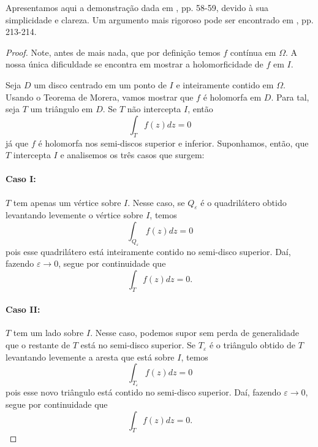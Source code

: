Apresentamos aqui a demonstração dada em \cite{MR1976398}, pp. 58-59, 
devido à sua simplicidade e clareza. Um argumento mais rigoroso pode ser 
encontrado em \cite{MR503901}, pp. 213-214.

\begin{proof}
Note, antes de mais nada, que por definição temos $f$ contínua em $\Omega$.
A nossa única dificuldade se encontra em mostrar a holomorficidade de $f$ em $I$.

Seja $D$ um disco centrado em um ponto de $I$ e inteiramente contido em $\Omega$.
Usando o Teorema de Morera, vamos mostrar que $f$ é holomorfa em $D$. Para tal,
seja $T$ um triângulo em $D$. Se $T$ não intercepta $I$, então
\begin{equation*}
    \int_T f(z) dz = 0
\end{equation*}
já que $f$ é holomorfa nos semi-discos superior e inferior. Suponhamos, então,
que $T$ intercepta $I$ e analisemos os três casos que surgem:
\paragraph{Caso I:} $T$ tem apenas um vértice sobre $I$. Nesse caso, se 
$Q_{\varepsilon}$ é o quadrilátero obtido levantando levemente o vértice sobre $I$,
temos
\begin{equation*}
    \int_{Q_{\varepsilon}} f(z) dz = 0
\end{equation*}
pois esse quadrilátero está inteiramente contido no semi-disco superior. Daí,
fazendo $\varepsilon\to 0$, segue por continuidade que
\begin{equation*}
    \int_T f(z) dz = 0.
\end{equation*}

\paragraph{Caso II:} $T$ tem um lado sobre $I$. Nesse caso, podemos supor sem perda
de generalidade que o restante de $T$ está no semi-disco superior. Se $T_{\varepsilon}$
é o triângulo obtido de $T$ levantando levemente a aresta que está sobre $I$, temos
\begin{equation*}
    \int_{T_{\varepsilon}} f(z) dz = 0
\end{equation*}
pois esse novo triângulo está contido no semi-disco superior. Daí, fazendo 
$\varepsilon\to 0$, segue por continuidade que
\begin{equation*}
    \int_T f(z) dz = 0.
\end{equation*}


\end{proof}
